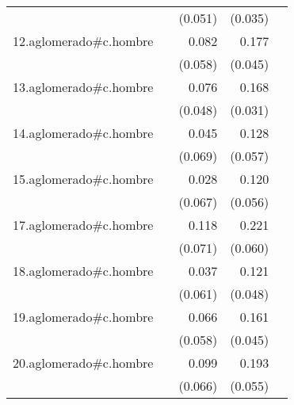 {\begin{longtable}{l*{4}{D{.}{.}{-1}}}
            &                     &     (0.051)         &     (0.035)         &                     \\
\addlinespace
12.aglomerado#c.hombre&                     &       0.082         &       0.177\sym{***}&                     \\
            &                     &     (0.058)         &     (0.045)         &                     \\
\addlinespace
13.aglomerado#c.hombre&                     &       0.076         &       0.168\sym{***}&                     \\
            &                     &     (0.048)         &     (0.031)         &                     \\
\addlinespace
14.aglomerado#c.hombre&                     &       0.045         &       0.128\sym{*}  &                     \\
            &                     &     (0.069)         &     (0.057)         &                     \\
\addlinespace
15.aglomerado#c.hombre&                     &       0.028         &       0.120\sym{*}  &                     \\
            &                     &     (0.067)         &     (0.056)         &                     \\
\addlinespace
17.aglomerado#c.hombre&                     &       0.118         &       0.221\sym{***}&                     \\
            &                     &     (0.071)         &     (0.060)         &                     \\
\addlinespace
18.aglomerado#c.hombre&                     &       0.037         &       0.121\sym{*}  &                     \\
            &                     &     (0.061)         &     (0.048)         &                     \\
\addlinespace
19.aglomerado#c.hombre&                     &       0.066         &       0.161\sym{***}&                     \\
            &                     &     (0.058)         &     (0.045)         &                     \\
\addlinespace
20.aglomerado#c.hombre&                     &       0.099         &       0.193\sym{***}&                     \\
            &                     &     (0.066)         &     (0.055)         &                     \\

\end{longtable}}

